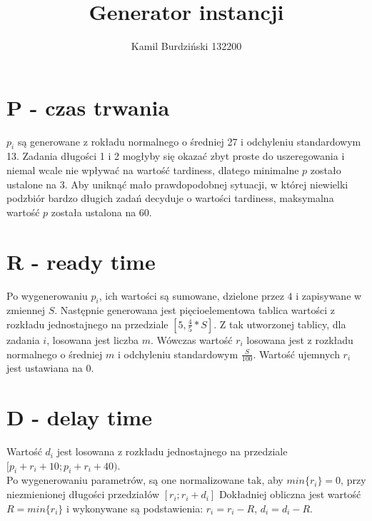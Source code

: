 \documentclass[12pt]{article}
\title{Generator instancji}
\author{Kamil Burdziński 132200}
\date{}
\begin{document}
\maketitle

\section{P - czas trwania}
$p_i$ są generowane z rokładu normalnego o średniej 27 i odchyleniu standardowym 13. Zadania długości 1 i 2
mogłyby się okazać zbyt proste do uszeregowania i niemal wcale nie wpływać na wartość tardiness, dlatego
minimalne $p$ zostało ustalone na 3. Aby uniknąć mało prawdopodobnej sytuacji, w której niewielki podzbiór bardzo
długich zadań decyduje o wartości tardiness, maksymalna wartość $p$ została ustalona na 60.

\section{R - ready time}
Po wygenerowaniu $p_i$, ich wartości są sumowane, dzielone przez $4$ i zapisywane w zmiennej $S$.
Następnie generowana jest pięcioelementowa tablica wartości z rozkładu jednostajnego
na przedziale $[5, \tfrac{4}{5}*S]$. Z tak utworzonej tablicy, dla zadania $i$,
losowana jest liczba $m$. Wówczas wartość $r_i$ losowana jest z rozkładu normalnego 
o średniej $m$ i odchyleniu standardowym $\tfrac{S}{100}$. Wartość ujemnych $r_i$ jest 
ustawiana na $0$.
\section{D - delay time}
Wartość $d_i$ jest losowana z rozkładu jednostajnego na przedziale 
$[p_i+r_i+10; p_i+r_i+40)$. \\

Po wygenerowaniu parametrów, są one normalizowane tak, aby $min\{r_i\}=0$, przy niezmienionej
długości przedziałów $[r_i; r_i+d_i]$
Dokładniej obliczna jest wartość $R = min\{r_i\}$ i wykonywane są podstawienia:
$r_i = r_i - R$, $d_i = d_i - R$.
\end{document}

